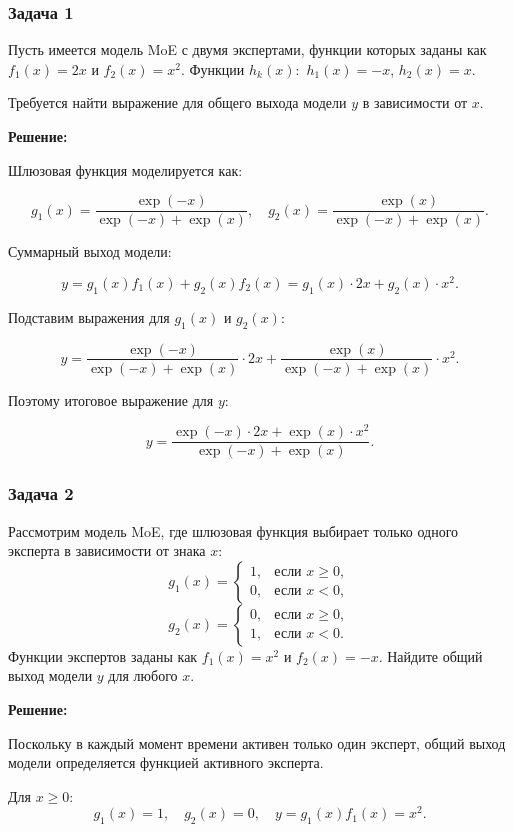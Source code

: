\subsubsection{Задача 1}

Пусть имеется модель MoE с двумя экспертами, функции которых заданы как $f_1(x) = 2x$ и $f_2(x) = x^2$. Функции $h_k (x):$ $h_1 (x) = -x$, $h_2 (x) = x$.

Требуется найти выражение для общего выхода модели $y$ в зависимости от $x$.

\textbf{Решение:}

Шлюзовая функция моделируется как:

$$
g_1(x) = \frac{\exp(-x)}{\exp(-x) + \exp(x)}, \quad g_2(x) = \frac{\exp(x)}{\exp(-x) + \exp(x)}.
$$

Суммарный выход модели:

$$
y = g_1(x) f_1(x) + g_2(x) f_2(x) = g_1(x) \cdot 2x + g_2(x) \cdot x^2.
$$

Подставим выражения для $g_1(x)$ и $g_2(x)$:

$$
y = \frac{\exp(-x)}{\exp(-x) + \exp(x)} \cdot 2x + \frac{\exp(x)}{\exp(-x) + \exp(x)} \cdot x^2.
$$

Поэтому итоговое выражение для $y$:

$$
y = \frac{\exp(-x) \cdot 2x + \exp(x) \cdot x^2}{\exp(-x) + \exp(x)}.
$$

\subsubsection{Задача 2}

Рассмотрим модель MoE, где шлюзовая функция выбирает только одного эксперта в зависимости от знака $x$:
$$
g_1(x) = 
\begin{cases} 
1, & \text{если } x \geq 0, \\ 
0, & \text{если } x < 0,
\end{cases}
$$
$$
g_2(x) = 
\begin{cases} 
0, & \text{если } x \geq 0, \\ 
1, & \text{если } x < 0.
\end{cases}
$$
Функции экспертов заданы как $f_1(x) = x^2$ и $f_2(x) = -x$. Найдите общий выход модели $y$ для любого $x$.

\textbf{Решение:}

Поскольку в каждый момент времени активен только один эксперт, общий выход модели определяется функцией активного эксперта.

Для $x \geq 0$: 
$$
g_1(x) = 1, \quad g_2(x) = 0, \quad y = g_1(x) f_1(x) = x^2.
$$


